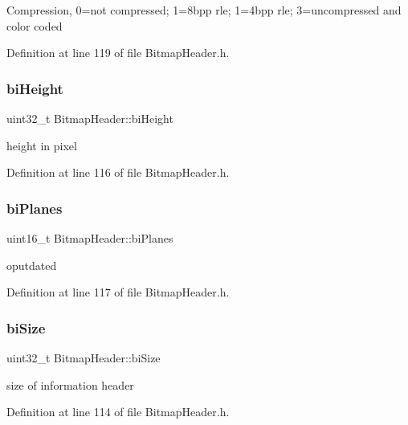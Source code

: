 Compression, 0=not compressed; 1=8bpp rle; 1=4bpp rle; 3=uncompressed and color coded 

Definition at line 119 of file Bitmap\+Header.\+h.

\mbox{\label{classBitmapHeader_a76091025a4295933d3127ae41c6e6611}} 
\subsubsection{\texorpdfstring{biHeight}{biHeight}}
{\footnotesize\ttfamily uint32\+\_\+t Bitmap\+Header\+::bi\+Height\hspace{0.3cm}{\ttfamily [private]}}

height in pixel 

Definition at line 116 of file Bitmap\+Header.\+h.

\mbox{\label{classBitmapHeader_ae3a65beab7af6e5dc8c9cda16bacc950}} 
\subsubsection{\texorpdfstring{biPlanes}{biPlanes}}
{\footnotesize\ttfamily uint16\+\_\+t Bitmap\+Header\+::bi\+Planes\hspace{0.3cm}{\ttfamily [private]}}

oputdated 

Definition at line 117 of file Bitmap\+Header.\+h.

\mbox{\label{classBitmapHeader_ad9bbbb6a668069bd7e6cd16adedce38f}} 
\subsubsection{\texorpdfstring{biSize}{biSize}}
{\footnotesize\ttfamily uint32\+\_\+t Bitmap\+Header\+::bi\+Size\hspace{0.3cm}{\ttfamily [private]}}

size of information header 

Definition at line 114 of file Bitmap\+Header.\+h.

\mbox{\label{classBitmapHeader_a4ca96d50917d71818b503ebbe854503f}} 
